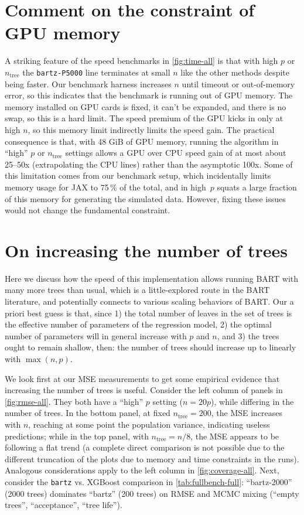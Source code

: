 \documentclass{article}
\begin{document}
\section{Comment on the constraint of GPU memory}
\label{sec:gpumem}

A striking feature of the speed benchmarks in \autoref{fig:time-all} is that
with high $p$ or $n_\text{tree}$ the \texttt{bartz-P5000} line terminates at
small $n$ like the other methods despite being faster. Our benchmark harness
increases $n$ until timeout or out-of-memory error, so this indicates that
the benchmark is running out of GPU memory. The memory installed on GPU cards
is fixed, it can't be expanded, and there is no swap, so this is a hard limit.
The speed premium of the GPU kicks in only at high $n$, so this memory limit
indirectly limits the speed gain. The practical consequence is that, with 48
GiB of GPU memory, running the algorithm in ``high'' $p$ or $n_\text{tree}$
settings allows a GPU over CPU speed gain of at most about 25--50x (extrapolating the CPU lines) rather than the
asymptotic 100x.
Some of this limitation comes from our benchmark setup, which incidentally
limits memory usage for JAX to 75\,\% of the total, and in high~$p$ squats a large fraction of this memory for
generating the simulated data. However, fixing these issues would not change
the fundamental constraint.

\section{On increasing the number of trees}
\label{sec:moretrees}

Here we discuss how the speed of this implementation allows running BART with many
more trees than usual, which is a little-explored route in the BART literature, and
potentially connects to various scaling behaviors of BART. Our a priori best
guess is that, since 1) the total number of leaves in the set of trees is the
effective number of parameters of the regression model, 2) the optimal number
of parameters will in general increase with $p$ and $n$, and 3) the trees ought
to remain shallow, then: the number of trees should increase up to linearly
with $\max(n, p)$.

We look first at our MSE measurements to get some empirical evidence that
increasing the number of trees is useful. Consider the left column of panels in
\autoref{fig:rmse-all}. They both have a ``high'' $p$ setting ($n = 20p$),
while differing in the number of trees. In the bottom panel, at fixed
$n_\text{tree}=200$, the MSE increases with $n$, reaching at some point the
population variance, indicating useless predictions; while in the top panel,
with $n_\text{tree}=n/8$, the MSE appears to be following a flat trend (a
complete direct comparison is not possible due to the different truncation of
the plots due to memory and time constraints in the runs). Analogous
considerations apply to the left column in \autoref{fig:coverage-all}. Next,
consider the \texttt{bartz} vs.{} XGBoost comparison in \autoref{tab:fullbench-full}:
``bartz-2000'' (2000 trees) dominates ``bartz'' (200 trees) on RMSE and MCMC
mixing (``empty trees'', ``acceptance'', ``tree life'').
\end{document}

